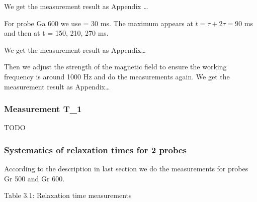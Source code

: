 We get the measurement result as Appendix \ldots{}

For probe Ga 600 we use \tau = 30 ms. The maximum appears at
$t=\tau+2\tau=90$ ms and then at t = 150, 210, 270 ms.

We get the measurement result as Appendix\ldots{}

Then we adjust the strength of the magnetic field to ensure the working
frequency is around 1000 Hz and do the measurements again. We get the
measurement result as Appendix\ldots{}

\subsubsection{Measurement T\_1}\label{measurement-t_1}

TODO

\subsubsection{Systematics of relaxation times for 2 probes}\label{2-probes}

According to the description in last section we do the measurements for
probes Gr 500 and Gr 600.

Table 3.1: Relaxation time measurements

